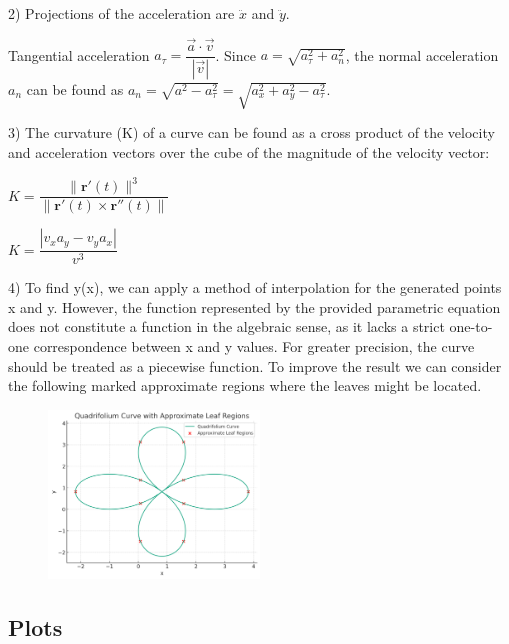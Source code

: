 \documentclass{article}
\begin{document}
2) Projections of the acceleration are $\ddot{x}$ and $\ddot{y}$. 

Tangential acceleration $a_\tau = \dfrac{\vec{a} \cdot \vec{v}}{|\vec{v}|}$. 
Since $a = \sqrt{a_\tau^2 + a_n^2}$, the normal acceleration $a_n$ can be found as $a_n = \sqrt{a^2 - a_\tau^2} = \sqrt{a_x^2 + a_y^2 - a_\tau^2}$.

3) The curvature (K) of a curve can be found as a cross product of the velocity and acceleration vectors over the cube of the magnitude of the velocity vector: 

$K = \dfrac{\| \mathbf{r}'(t) \|^3}{\| \mathbf{r}'(t) \times \mathbf{r}''(t) \|}$

$K = \dfrac{\left| v_x a_y - v_y a_x \right|}{v^3}$

4) To find y(x), we can apply a method of interpolation for the generated points x and y. However, the function represented by the provided parametric equation does not constitute a function in the algebraic sense, as it lacks a strict one-to-one correspondence between x and y values. For greater precision, the curve should be treated as a piecewise function.
To improve the result we can consider the following marked approximate regions where the leaves might be located.

\begin{figure}[H]
    \centering
    \includegraphics[width=0.5\textwidth]{quadrifollium.png}
\end{figure}


\subsection{Plots}
\end{document}
